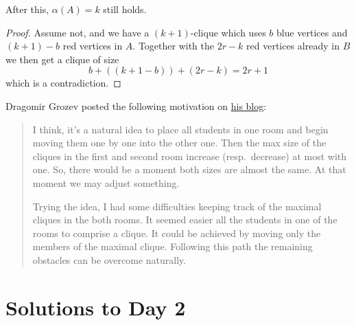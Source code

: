 \begin{claim*}
  After this, $\alpha(A) = k$ still holds.
\end{claim*}
\begin{proof}
  Assume not, and we have a $(k+1)$-clique
  which uses $b$ blue vertices and $(k+1)-b$ red vertices in $A$.
  Together with the $2r-k$ red vertices already in $B$
  we then get a clique of size
  \[ b + \left( (k+1-b) \right)
  + \left( 2r-k \right) = 2r + 1 \]
  which is a contradiction.
\end{proof}

\begin{remark*}
  Dragomir Grozev posted the
  following motivation on
  \href{https://dgrozev.wordpress.com/2019/12/05/splitting-the-cliques-of-a-graph-imo-2007-p3/}{his blog}:
  \begin{quote}
  I think, it’s a natural idea to
  place all students in one room and begin
  moving them one by one into the other one.
  Then the max size of the cliques in the first and second room
  increase (resp.\ decrease) at most with one.
  So, there would be a moment both sizes are almost the same.
  At that moment we may adjust something.

  Trying the idea, I had some difficulties
  keeping track of the maximal cliques in the both rooms.
  It seemed easier all the students in one of the rooms
  to comprise a clique.
  It could be achieved by moving only the members
  of the maximal clique.
  Following this path the remaining obstacles
  can be overcome naturally.
  \end{quote}
\end{remark*}
\pagebreak

\section{Solutions to Day 2}